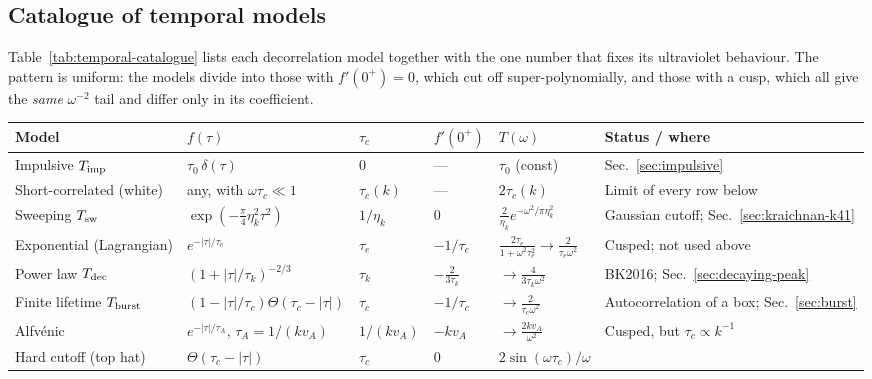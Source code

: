 \documentclass[10pt,prd,aps,nobibnotes,superscriptaddress,preprintnumbers,notitlepage]{revtex4-1}
\begin{document}
\subsection{Catalogue of temporal models}
\label{sec:temporal-catalogue}

Table~\ref{tab:temporal-catalogue} lists each decorrelation model together with
the one number that fixes its ultraviolet behaviour. The pattern is uniform: the
models divide into those with $f'(0^{+})=0$, which cut off super-polynomially,
and those with a cusp, which all give the \emph{same} $\omega^{-2}$ tail and
differ only in its coefficient.

\begin{table}[ht]
  \centering
  \begin{tabular}{@{}p{} p{} p{} p{} p{} p{}@{}}
  \hline\hline
  Model & $f(\tau)$ & $\tau_c$ & $f'(0^{+})$ & $T(\omega)$ & Status / where \\
  \hline
  Impulsive $T_{\rm imp}$ &
    $\tau_0\,\delta(\tau)$ & $0$ & --- &
    $\tau_0$ (const) &
    Sec.~\ref{sec:impulsive} \\
  Short-correlated (white) &
    any, with $\omega\tau_c\ll1$ & $\tau_c(k)$ & --- &
    $2\tau_c(k)$ &
    Limit of every row below \\
  Sweeping $T_{\rm sw}$ &
    $\exp(-\tfrac{\pi}{4}\eta_k^{2}\tau^{2})$ & $1/\eta_k$ & $0$ &
    $\tfrac{2}{\eta_k}e^{-\omega^{2}/\pi\eta_k^{2}}$ &
    Gaussian cutoff; Sec.~\ref{sec:kraichnan-k41} \\
  Exponential (Lagrangian) &
    $e^{-|\tau|/\tau_e}$ & $\tau_e$ & $-1/\tau_e$ &
    $\tfrac{2\tau_e}{1+\omega^{2}\tau_e^{2}}\to\tfrac{2}{\tau_e\omega^{2}}$ &
    Cusped; not used above \\
  Power law $T_{\rm dec}$ &
    $(1+|\tau|/\tau_k)^{-2/3}$ & $\tau_k$ & $-\tfrac{2}{3\tau_k}$ &
    $\to\tfrac{4}{3\tau_k\omega^{2}}$ &
    BK2016; Sec.~\ref{sec:decaying-peak} \\
  Finite lifetime $T_{\rm burst}$ &
    $(1-|\tau|/\tau_c)\Theta(\tau_c-|\tau|)$ & $\tau_c$ & $-1/\tau_c$ &
    $\to\tfrac{2}{\tau_c\omega^{2}}$ &
    Autocorrelation of a box; Sec.~\ref{sec:burst} \\
  Alfv\'enic &
    $e^{-|\tau|/\tau_A}$, $\tau_A=1/(kv_A)$ & $1/(kv_A)$ & $-kv_A$ &
    $\to\tfrac{2kv_A}{\omega^{2}}$ &
    Cusped, but $\tau_c\propto k^{-1}$ \\
  Hard cutoff (top hat) &
    $\Theta(\tau_c-|\tau|)$ & $\tau_c$ & $0$ &
    $2\sin(\omega\tau_c)/\omega$ &

\end{tabular}
\end{table}
\end{document}
